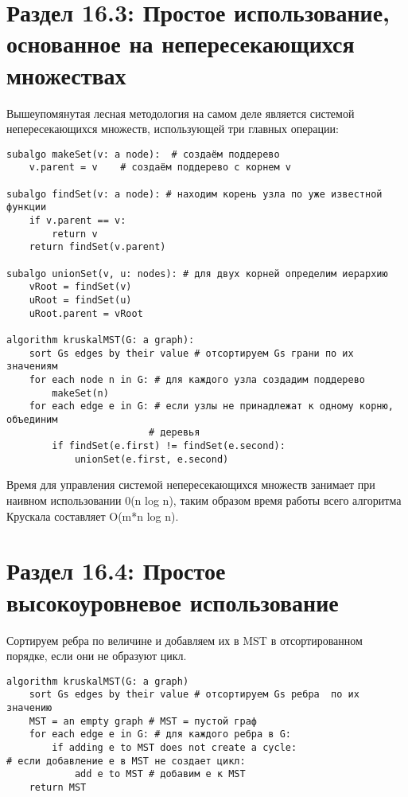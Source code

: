\vspace{\baselineskip}
\section*{Раздел 16.3: Простое использование, основанное на непересекающихся множествах}

\vspace{\baselineskip}
Вышеупомянутая лесная методология на самом деле является системой непересекающихся множеств, использующей три главных операции:

\vspace{\baselineskip}
\begin{tcolorbox}
\begin{verbatim}
subalgo makeSet(v: a node):  # создаём поддерево
	v.parent = v	# создаём поддерево с корнем v
   
subalgo findSet(v: a node): # находим корень узла по уже известной функции
	if v.parent == v:
		return v
	return findSet(v.parent)

subalgo unionSet(v, u: nodes): # для двух корней определим иерархию
	vRoot = findSet(v)
	uRoot = findSet(u)
	uRoot.parent = vRoot

algorithm kruskalMST(G: a graph):
	sort Gs edges by their value # отсортируем Gs грани по их значениям
	for each node n in G: # для каждого узла создадим поддерево
		makeSet(n)
	for each edge e in G: # если узлы не принадлежат к одному корню, объединим 
						 # деревья
		if findSet(e.first) != findSet(e.second):
			unionSet(e.first, e.second)
\end{verbatim}
\end{tcolorbox}

\vspace{\baselineskip}
Время для управления системой непересекающихся множеств занимает при наивном использовании 0(n log n), таким образом время работы всего алгоритма Крускала составляет O(m*n log n).

\vspace{\baselineskip}
\section*{Раздел 16.4: Простое высокоуровневое использование}

\vspace{\baselineskip}
Сортируем ребра по величине и добавляем их в MST в отсортированном порядке, если они не образуют цикл. 

\vspace{\baselineskip}
\begin{tcolorbox}
\begin{verbatim}
algorithm kruskalMST(G: a graph)
	sort Gs edges by their value # отсортируем Gs ребра  по их значению
	MST = an empty graph # MST = пустой граф
	for each edge e in G: # для каждого ребра в G:
		if adding e to MST does not create a cycle:
# если добавление e в MST не создает цикл:
			add e to MST # добавим е к MST
    return MST
\end{verbatim}
\end{tcolorbox}

